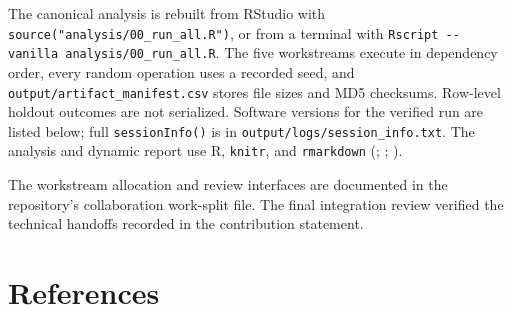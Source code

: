 \documentclass[
  10pt,
]{article}
\newcommand{\tightinputtable}[1]{%
  \begingroup\small\setlength{\tabcolsep}{4pt}\endgroup%
}
\begin{document}
The canonical analysis is rebuilt from RStudio with
\texttt{source("analysis/00\_run\_all.R")}, or from a terminal with
\texttt{Rscript\ -\/-vanilla\ analysis/00\_run\_all.R}. The five
workstreams execute in dependency order, every random operation uses a
recorded seed, and \texttt{output/artifact\_manifest.csv} stores file
sizes and MD5 checksums. Row-level holdout outcomes are not serialized.
Software versions for the verified run are listed below; full
\texttt{sessionInfo()} is in \texttt{output/logs/session\_info.txt}. The
analysis and dynamic report use R, \texttt{knitr}, and
\texttt{rmarkdown} (;
;
).

\tightinputtable{../output/tables/tab_reproducibility_versions.tex}

The workstream allocation and review interfaces are documented in the
repository's collaboration work-split file. The final integration review
verified the technical handoffs recorded in the contribution statement.

\newpage

\section*{References}\label{references}
\end{document}
